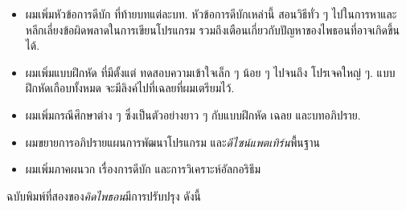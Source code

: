 \begin{itemize}


\item ผมเพิ่มหัวข้อการดีบัก ที่ท้ายบทแต่ละบท.
หัวข้อการดีบักเหล่านี้ สอนวิธีทั่ว ๆ ไปในการหาและหลีกเลี่ยงข้อผิดพลาดในการเขียนโปรแกรม 
รวมถึงเตือนเกี่ยวกับปัญหาของไพธอนที่อาจเกิดขึ้นได้.


\item ผมเพิ่มแบบฝึกหัด ที่มีตั้งแต่ ทดสอบความเข้าใจเล็ก ๆ น้อย ๆ ไปจนถึง โปรเจคใหญ่ ๆ.
แบบฝึกหัดเกือบทั้งหมด จะมีลิงค์ไปที่เฉลยที่ผมเตรียมไว้.


\item ผมเพิ่มกรณีศึกษาต่าง ๆ ซึ่งเป็นตัวอย่างยาว ๆ กับแบบฝึกหัด เฉลย และบทอภิปราย.



\item ผมขยายการอภิปรายแผนการพัฒนาโปรแกรม และ\textit{ดีไซน์แพตเทิร์น}พื้นฐาน


\item ผมเพิ่มภาคผนวก เรื่องการดีบัก และการวิเคราะห์อัลกอริธึม


\end{itemize}

ฉบับพิมพ์ที่สองของ\textit{คิดไพธอน}มีการปรับปรุง ดังนี้

